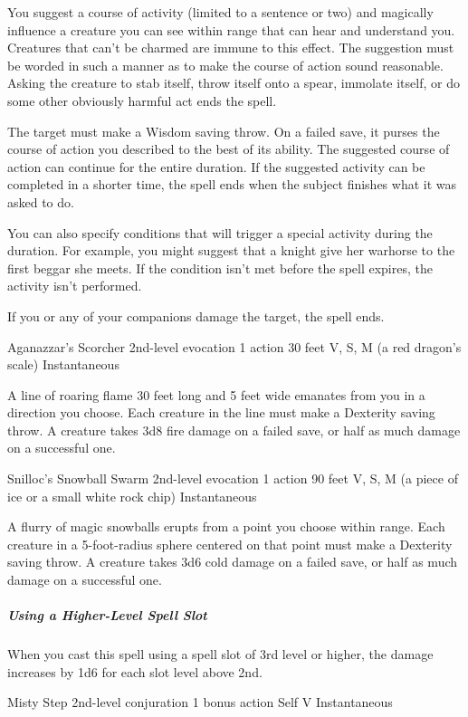 \documentclass[letterpaper,openany,oneside,twocolumn]{book}
\begin{document}
You suggest a course of activity (limited to a sentence or two) and magically influence a creature you can see within range that can hear and understand you. Creatures that can’t be charmed are immune to this effect. The suggestion must be worded in such a manner as to make the course of action sound reasonable. Asking the creature to stab itself, throw itself onto a spear, immolate itself, or do some other obviously harmful act ends the spell.

The target must make a Wisdom saving throw. On a failed save, it purses the course of action you described to the best of its ability. The suggested course of action can continue for the entire duration. If the suggested activity can be completed in a shorter time, the spell ends when the subject finishes what it was asked to do.

You can also specify conditions that will trigger a special activity during the duration. For example, you might suggest that a knight give her warhorse to the first beggar she meets. If the condition isn’t met before the spell expires, the activity isn’t performed.

If you or any of your companions damage the target, the spell ends.

\DndSpellHeader
  {Aganazzar's Scorcher}
  {2nd-level evocation }
  {1 action}
  {30 feet}
  {V, S, M (a red dragon’s scale)}
  {Instantaneous}

A line of roaring flame 30 feet long and 5 feet wide emanates from you in a direction you choose. Each creature in the line must make a Dexterity saving throw. A creature takes 3d8 fire damage on a failed save, or half as much damage on a successful one.

\DndSpellHeader
  {Snilloc's Snowball Swarm}
  {2nd-level evocation }
  {1 action}
  {90 feet}
  {V, S, M (a piece of ice or a small white rock chip)}
  {Instantaneous}

A flurry of magic snowballs erupts from a point you choose within range. Each creature in a 5-foot-radius sphere centered on that point must make a Dexterity saving throw. A creature takes 3d6 cold damage on a failed save, or half as much damage on a successful one.

\subparagraph*{Using a Higher-Level Spell Slot} When you cast this spell using a spell slot of 3rd level or higher, the damage increases by 1d6 for each slot level above 2nd.

\DndSpellHeader
  {Misty Step}
  {2nd-level conjuration }
  {1 bonus action}
  {Self}
  {V}
  {Instantaneous}
\end{document}
